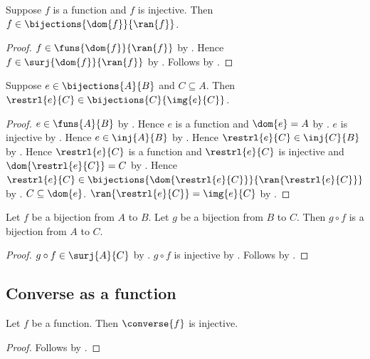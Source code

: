\begin{proposition}\label{injective_function_bijection_to_range}
    Suppose $f$ is a function and $f$ is injective.
    Then $f\in\bijections{\dom{f}}{\ran{f}}$.
\end{proposition}
\begin{proof}
    $f\in\funs{\dom{f}}{\ran{f}}$ by
        .
    Hence $f\in\surj{\dom{f}}{\ran{f}}$ by .
    Follows by .
\end{proof}

\begin{proposition}\label{bijection_restriction_to_image}
    Suppose $e\in\bijections{A}{B}$ and $C\subseteq A$.
    Then $\restrl{e}{C}\in\bijections{C}{\img{e}{C}}$.
\end{proposition}
\begin{proof}
    $e\in\funs{A}{B}$ by .
    Hence $e$ is a function and $\dom{e}=A$ by
        .
    $e$ is injective by .
    Hence $e\in\inj{A}{B}$ by .
    Hence $\restrl{e}{C}\in\inj{C}{B}$ by .
    Hence $\restrl{e}{C}$ is a function and
        $\restrl{e}{C}$ is injective and
        $\dom{\restrl{e}{C}}=C$ by
        .
    Hence $\restrl{e}{C}\in
        \bijections{\dom{\restrl{e}{C}}}{\ran{\restrl{e}{C}}}$ by
        .
    $C\subseteq\dom{e}$.
    $\ran{\restrl{e}{C}}=\img{e}{C}$ by .
\end{proof}

\begin{proposition}\label{bijection_circ}
    Let $f$ be a bijection from $A$ to $B$.
    Let $g$ be a bijection from $B$ to $C$.
    Then $g\circ f$ is a bijection from $A$ to $C$.
\end{proposition}
\begin{proof}
    $g\circ f\in\surj{A}{C}$ by .
    $g\circ f$ is injective by .
    Follows by .
\end{proof}

\subsection{Converse as a function}

\begin{proposition}\label{converse_of_function_is_injective}
    Let $f$ be a function.
    Then $\converse{f}$ is injective. %
\end{proposition}
\begin{proof}
    Follows by .
\end{proof}

